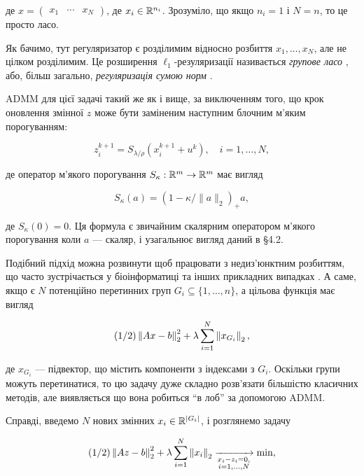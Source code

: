 де $x = \begin{pmatrix} x_1 & \cdots & x_N \end{pmatrix}$, де $x_i \in \mathbb{R}^{n_i}$. Зрозуміло, що якщо $n_i = 1$ і $N = n$, то це просто ласо. \medskip

Як бачимо, тут регуляризатор є розділимим відносно розбиття $x_1, \ldots, x_N$, але не цілком розділимим. Це розширення $\ell_1$-резуляризації називається \textit{групове ласо} \cite{177}, або, більш загально, \textit{регуляризація сумою норм} \cite{136}. \medskip

ADMM для цієї задачі такий же як і вище, за виключенням того, що крок оновлення змінної $z$ може бути заміненим наступним блочним м'яким порогуванням:

\begin{equation}
    z_i^{k + 1} = S_{\lambda / \rho} \left( x_i^{k + 1} + u^k \right), \quad i = 1, \ldots, N,
\end{equation}

де оператор м'якого порогування $S_\kappa: \mathbb{R}^m \to \mathbb{R}^m$ має вигляд

\begin{equation}
    S_\kappa (a) = \left(1 - \kappa / \|a\|_2 \right)_+ a,
\end{equation}

де $S_\kappa(0) = 0$. Ця формула є звичайним скалярним оператором м'якого порогування коли $a$ --- скаляр, і узагальнює вигляд даний в \S4.2. \medskip

Подібний підхід можна розвинути щоб працювати з недиз'юнктним розбиттям, що часто зустрічається у біоінформатиці та інших прикладних випадках \cite{181, 118}. А саме, якщо є $N$ потенційно перетинних груп $G_i \subseteq \{1, \ldots, n\}$, а цільова функція має вигляд

\begin{equation}
    (1/2) \left\| A x - b\right\|_2^2 + \lambda \operatorname*{\sum}_{i = 1}^N \left\| x_{G_i} \right\|_2,
\end{equation}

де $x_{G_i}$ --- підвектор, що містить компоненти з індексами з $G_i$. Оскільки групи можуть перетинатися, то цю задачу дуже складно розв'язати більшістю класичних методів, але виявляється що вона робиться ``в лоб'' за допомогою ADMM. \medskip

Справді, введемо $N$ нових змінних $x_i \in \mathbb{R}^{|G_i|}$, і розглянемо задачу

\begin{equation}
    (1/2) \left\| A z - b\right\|_2^2 + \lambda \operatorname*{\sum}_{i = 1}^N \left\| x_i \right\|_2 \xrightarrow[\substack{x_i - z_i = 0, \\ i = 1, \ldots, N}]{} \min,
\end{equation}

